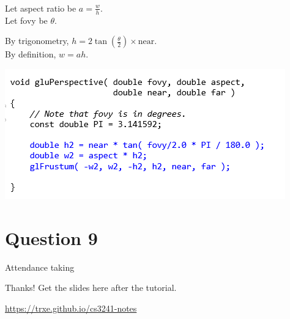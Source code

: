 \documentclass{beamer}
\begin{document}
\begin{frame}
    \frametitle{}
    Let aspect ratio be $a = \frac{w}{h}$.\\
    Let fovy be $\theta$.\\

    \vspace{1em}

    By trigonometry, $h = 2\tan(\frac{\theta}{2}) \times \text{near}$.\\
    By definition, $w = ah$.

    \vspace{1em}

    \begin{center}
        \includegraphics[scale=0.8]{q8-ans.png}
    \end{center}

\end{frame}

\section{Question 9}

\begin{frame}
    \AlegreyaExtraBold \LARGE
    Attendance taking
\end{frame}

\ThankYou
\begin{frame}
    Thanks! Get the slides here after the tutorial.\\
    \vspace{2em}
    \scalebox{3}{\faGithub}\par\bigskip
    \url{https://trxe.github.io/cs3241-notes}
\end{frame}
\end{document}

